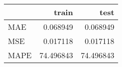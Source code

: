 \begin{tabular}{lrr}
\toprule
{} &      train &       test \\
\midrule
MAE  &   0.068949 &   0.068949 \\
MSE  &   0.017118 &   0.017118 \\
MAPE &  74.496843 &  74.496843 \\
\bottomrule
\end{tabular}
